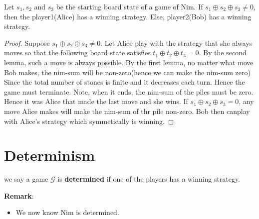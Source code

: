 \begin{theorem}
    Let $s_1,s_2$ and $s_3$ be the starting board state of a game of Nim. 
    If $s_1 \oplus s_2 \oplus s_3 \neq 0$, then the player1(Alice) has a winning strategy. Else, player2(Bob) has a winning strategy.
\end{theorem}
\begin{proof}
    Suppose $s_1 \oplus s_2 \oplus s_3 \neq 0$. 
    Let Alice play with the strategy that she always moves so that the following board state satisfies $t_1 \oplus t_2 \oplus t_3 =0$. 
    By the second lemma, such a move is always possible. By the first lemma, no matter what move Bob makes, the nim-sum will be non-zero(hence we can make the nim-sum zero) 
    Since the total number of stones is finite and it decreases each turn. Hence the game must terminate. 
    Note, when it ends, the nim-sum of the piles must be zero. 
    Hence it was Alice that made the last move and she wins. 
    If $s_1 \oplus s_2 \oplus s_3=0$, any move Alice makes will make the nim-sum of thr pile non-zero. 
    Bob then canplay with Alice's strategy which symmetically is winning.
\end{proof}


\section{Determinism}


\begin{definition}
    we say a game $\mathcal{G}$ is \textbf{determined} if one of the players has a winning strategy.
\end{definition}
\textbf{Remark}:
\begin{itemize}
    \item We now know Nim is determined.
\end{itemize}

